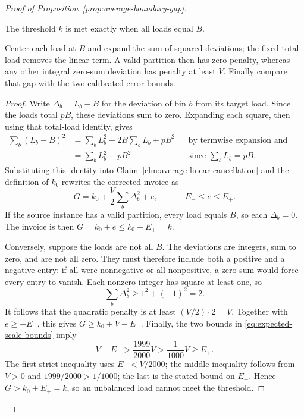 \begin{proof}[Proof of Proposition~\ref{prop:average-boundary-gap}]
\begin{claim}
\label{clm:average-imbalance-gap}
The threshold $k$ is met exactly when all loads equal $B$.
\end{claim}
\begin{proofstrategy}
Center each load at $B$ and expand the sum of squared deviations; the
fixed total load removes the linear term. A valid partition then has
zero penalty, whereas any other integral zero-sum deviation has penalty
at least $V$. Finally compare that gap with the two calibrated error
bounds.
\end{proofstrategy}
\begin{proof}
Write $\Delta_b=L_b-B$ for the deviation of bin $b$ from its target load.
Since the loads total $pB$, these deviations sum to zero. Expanding each
square, then using that total-load identity, gives
\begin{align*}
 \sum_b(L_b-B)^2
 &=\sum_bL_b^2-2B\sum_bL_b+pB^2
       &&\text{by termwise expansion and summation}\\
 &=\sum_bL_b^2-pB^2
       &&\text{since }\sum_bL_b=pB.
\end{align*}
Substituting this identity into
Claim~\ref{clm:average-linear-cancellation} and the definition of $k_0$
rewrites the corrected invoice as
\[
 G=k_0+\frac V2\sum_b\Delta_b^2+e,
 \qquad -E_-\le e\le E_+.
\]
If the source instance has a valid partition, every load equals $B$,
so each $\Delta_b=0$. The invoice is then $G=k_0+e\le k_0+E_+=k$.

Conversely, suppose the loads are not all $B$. The deviations are
integers, sum to zero, and are not all zero. They must therefore include
both a positive and a negative entry: if all were nonnegative or all
nonpositive, a zero sum would force every entry to vanish. Each nonzero
integer has square at least one, so
\[
 \sum_b\Delta_b^2\ge 1^2+(-1)^2=2.
\]
It follows that the quadratic penalty is at least
$(V/2)\cdot2=V$. Together with $e\ge-E_-$, this gives
$G\ge k_0+V-E_-$. Finally, the two bounds in
\eqref{eq:expected-scale-bounds} imply
\[
 V-E_->\frac{1999}{2000}V
       >\frac{1}{1000}V\ge E_+.
\]
The first strict inequality uses $E_-<V/2000$; the middle inequality
follows from $V>0$ and $1999/2000>1/1000$; the last is the stated bound
on $E_+$. Hence $G>k_0+E_+=k$, so an unbalanced load cannot meet the
threshold.
\end{proof}
\end{proof}

